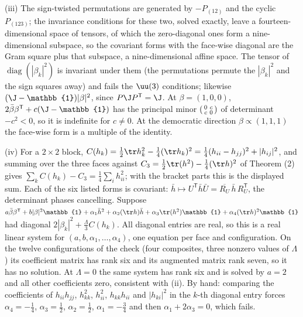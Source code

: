 (iii) The sign-twisted permutations are generated by $-P_{(12)}$ and the cyclic $P_{(123)}$; the invariance conditions for these two, solved exactly, leave a fourteen-dimensional space of tensors, of which the zero-diagonal ones form a nine-dimensional subspace, so the covariant forms with the face-wise diagonal are the Gram square plus that subspace, a nine-dimensional affine space. The tensor of $\operatorname{diag}(|\beta_{k}|^{2})$ is invariant under them (the permutations permute the $|\beta_{k}|^{2}$ and the sign squares away) and fails the $\uu(3)$ conditions; likewise $(\J - \mathbb{1})|\beta|^{2}$, since $P\J P^{\mathsf T} = \J$. At $\beta = (1, 0, 0)$, $2\bar\beta\beta^{\mathsf T} + c(\J - \mathbb{1})$ has the principal minor $\begin{psmallmatrix} 0 & c \\ c & 0 \end{psmallmatrix}$ of determinant $-c^{2} < 0$, so it is indefinite for $c \neq 0$. At the democratic direction $\beta \propto (1,1,1)$ the face-wise form is a multiple of the identity.

(iv) For a $2 \times 2$ block, $C(h_{k}) = \tfrac12\tr h_{k}^{2} - \tfrac14(\tr h_{k})^{2} = \tfrac14(h_{ii} - h_{jj})^{2} + |h_{ij}|^{2}$, and summing over the three faces against $C_{3} = \tfrac12\tr(h^{2}) - \tfrac14(\tr h)^{2}$ of Theorem (2) gives $\sum_{k}C(h_{k}) - C_{3} = \tfrac14\sum_{i}h_{ii}^{2}$; with the bracket parts this is the displayed sum. Each of the six listed forms is covariant: $\bar h \mapsto U^{\mathsf T}\bar h\bar U = \overline{R_{U}}\,\bar h\,R_{U}^{\mathsf T}$, the determinant phases cancelling. Suppose $a\bar\beta\beta^{\mathsf T} + b|\beta|^{2}\mathbb{1} + \alpha_{1}\bar h^{2} + \alpha_{2}(\tr h)\bar h + \alpha_{3}\tr(h^{2})\mathbb{1} + \alpha_{4}(\tr h)^{2}\mathbb{1}$ had diagonal $2|\beta_{k}|^{2} + \tfrac{\Lambda}{3}C(h_{k})$. All diagonal entries are real, so this is a real linear system for $(a, b, \alpha_{1}, \ldots, \alpha_{4})$, one equation per face and configuration. On the twelve configurations of the check (four composites, three nonzero values of $\Lambda$) its coefficient matrix has rank six and its augmented matrix rank seven, so it has no solution. At $\Lambda = 0$ the same system has rank six and is solved by $a = 2$ and all other coefficients zero, consistent with (ii). By hand: comparing the coefficients of $h_{ii}h_{jj}$, $h_{kk}^{2}$, $h_{ii}^{2}$, $h_{kk}h_{ii}$ and $|h_{ki}|^{2}$ in the $k$-th diagonal entry forces $\alpha_{4} = -\tfrac14$, $\alpha_{3} = \tfrac12$, $\alpha_{2} = \tfrac12$, $\alpha_{1} = -\tfrac34$ and then $\alpha_{1} + 2\alpha_{3} = 0$, which fails.

